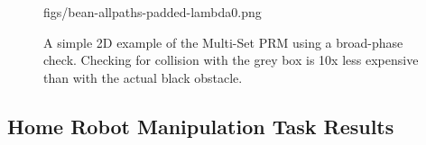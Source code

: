 \begin{figure}
{      {figs/bean-allpaths-padded-lambda0.png}
   }

   \caption{A simple 2D example of the Multi-Set PRM using
     a broad-phase check.
     Checking for collision with the grey box is 10x less expensive
     than with the actual black obstacle.}
   \label{fig:broad-phase-2d}
\end{figure}

\subsection{Home Robot Manipulation Task Results}
\label{subsec:herb-experiment}

